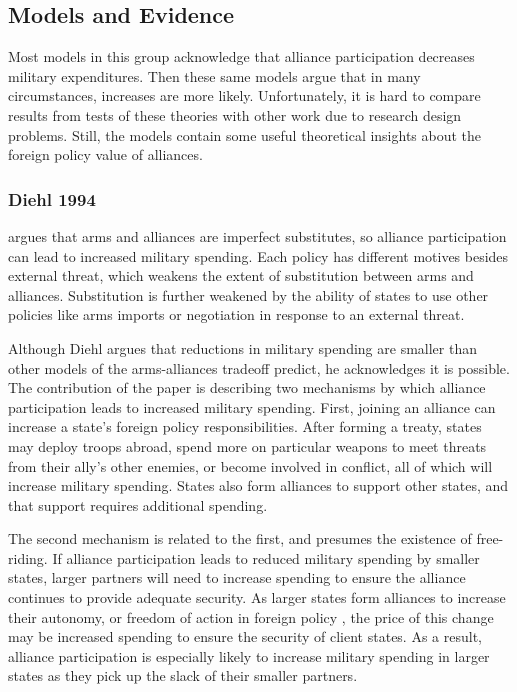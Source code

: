 \documentclass[12pt]{article}
\begin{document}
\subsection{Models and Evidence} 


Most models in this group acknowledge that alliance participation decreases military expenditures.
Then these same models argue that in many circumstances, increases are more likely. 
Unfortunately, it is hard to compare results from tests of these theories with other work due to research design problems. 
Still, the models contain some useful theoretical insights about the foreign policy value of alliances. 


\subsubsection{Diehl 1994}


\citet{Diehl1994} argues that arms and alliances are imperfect substitutes, so alliance participation can lead to increased military spending. 
Each policy has different motives besides external threat, which weakens the extent of substitution between arms and alliances.
Substitution is further weakened by the ability of states to use other policies like arms imports or negotiation in response to an external threat. 


Although Diehl argues that reductions in military spending are smaller than other models of the arms-alliances tradeoff predict, he acknowledges it is possible.
The contribution of the paper is describing two mechanisms by which alliance participation leads to increased military spending. 
First, joining an alliance can increase a state's foreign policy responsibilities. 
After forming a treaty, states may deploy troops abroad, spend more on particular weapons to meet threats from their ally's other enemies, or become involved in conflict, all of which will increase military spending. 
States also form alliances to support other states, and that support requires additional spending. 

The second mechanism is related to the first, and presumes the existence of free-riding. 
If alliance participation leads to reduced military spending by smaller states, larger partners will need to increase spending to ensure the alliance continues to provide adequate security. 
As larger states form alliances to increase their autonomy, or freedom of action in foreign policy \citep{Morrow1991}, the price of this change may be increased spending to ensure the security of client states. 
As a result, alliance participation is especially likely to increase military spending in larger states as they pick up the slack of their smaller partners. 
\end{document}
